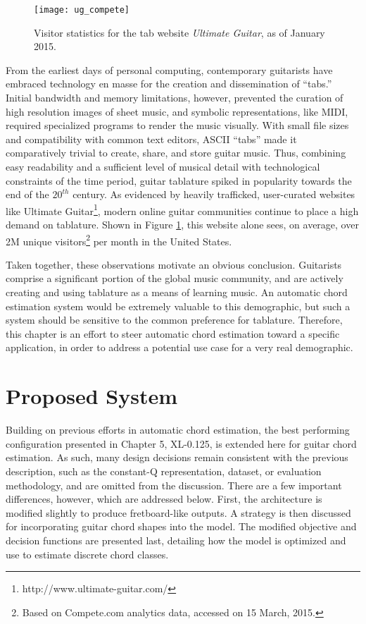 \begin{figure}[t!]
  \centering
  \centerline{\texttt{[image: ug\_compete]}}
\caption{Visitor statistics for the tab website \emph{Ultimate Guitar}, as of January 2015.}
\label{fig:ug_compete}
%
\end{figure}

From the earliest days of personal computing, contemporary guitarists have embraced technology en masse for the creation and dissemination of ``tabs.''
Initial bandwidth and memory limitations, however, prevented the curation of high resolution images of sheet music, and symbolic representations, like MIDI, required specialized programs to render the music visually.
With small file sizes and compatibility with common text editors, ASCII ``tabs'' made it comparatively trivial to create, share, and store guitar music.
Thus, combining easy readability and a sufficient level of musical detail with technological constraints of the time period, guitar tablature spiked in popularity towards the end of the $20^{th}$ century.
As evidenced by heavily trafficked, user-curated websites like Ultimate Guitar\footnote{http://www.ultimate-guitar.com/}, modern online guitar communities continue to place a high demand on tablature.
Shown in Figure \ref{fig:ug_compete}, this website alone sees, on average, over 2M unique visitors\footnote{Based on Compete.com analytics data, accessed on 15 March, 2015.} per month in the United States.

Taken together, these observations motivate an obvious conclusion.
Guitarists comprise a significant portion of the global music community, and are actively creating and using tablature as a means of learning music.
An automatic chord estimation system would be extremely valuable to this demographic, but such a system should be sensitive to the common preference for tablature.
Therefore, this chapter is an effort to steer automatic chord estimation toward a specific application, in order to address a potential use case for a very real demographic.


\section{Proposed System}

Building on previous efforts in automatic chord estimation, the best performing configuration presented in Chapter 5, XL-0.125, is extended here for guitar chord estimation.
As such, many design decisions remain consistent with the previous description, such as the constant-Q representation, dataset, or evaluation methodology, and are omitted from the discussion.
There are a few important differences, however, which are addressed below.
First, the architecture is modified slightly to produce fretboard-like outputs.
A strategy is then discussed for incorporating guitar chord shapes into the model.
The modified objective and decision functions are presented last, detailing how the model is optimized and use to estimate discrete chord classes.

